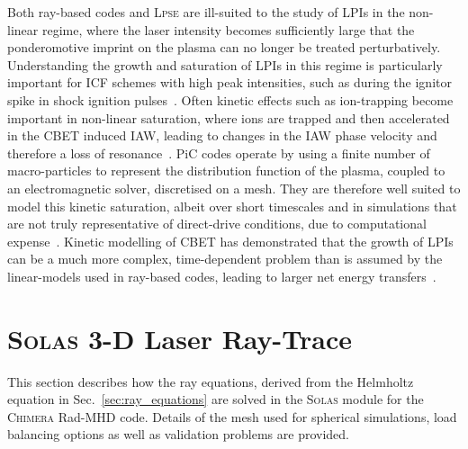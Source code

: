 Both ray-based codes and \textsc{Lpse} are ill-suited to the study of \ac{LPIs} in the non-linear regime, where the laser intensity becomes sufficiently large that the ponderomotive imprint on the plasma can no longer be treated perturbatively.
Understanding the growth and saturation of \ac{LPIs} in this regime is particularly important for \ac{ICF} schemes with high peak intensities, such as during the ignitor spike in shock ignition pulses~\cite{perkins_shock_2009}.
Often kinetic effects such as ion-trapping become important in non-linear saturation, where ions are trapped and then accelerated in the \ac{CBET} induced \ac{IAW}, leading to changes in the \ac{IAW} phase velocity and therefore a loss of resonance~\cite{nguyen_cross-beam_2021}.
\ac{PiC} codes operate by using a finite number of macro-particles to represent the distribution function of the plasma, coupled to an electromagnetic solver, discretised on a mesh.
They are therefore well suited to model this kinetic saturation, albeit over short timescales and in simulations that are not truly representative of direct-drive conditions, due to computational expense~\cite{seaton_cross-beam_2022-1}.
Kinetic modelling of \ac{CBET} has demonstrated that the growth of \ac{LPIs} can be a much more complex, time-dependent problem than is assumed by the linear-models used in ray-based codes, leading to larger net energy transfers~\cite{seaton_cross-beam_2022}.

\section{\textsc{Solas} 3-D Laser Ray-Trace}%
\label{sec:SOLAS_raytrace}

This section describes how the ray equations, derived from the Helmholtz equation in Sec.~\ref{sec:ray_equations} are solved in the \textsc{Solas} module for the \textsc{Chimera} \ac{Rad-MHD} code.
Details of the mesh used for spherical simulations, load balancing options as well as validation problems are provided.

